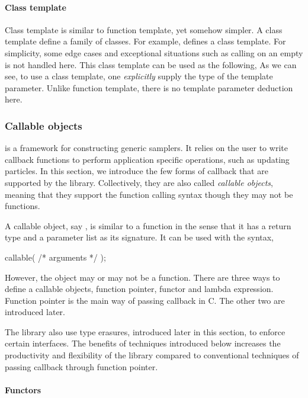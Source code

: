 \paragraph{Class template}

Class template is similar to function template, yet somehow simpler. A class
template define a family of classes. For example,
defines a  class template. For simplicity, some edge cases
and exceptional situations such as calling  on an empty
 is not handled here. This class template can be used as the
following,
As we can see, to use a class template, one \emph{explicitly} supply the type
of the template parameter. Unlike function template, there is no template
parameter deduction here.

\subsubsection{Callable objects}
\label{ssub:Callable objects}

\vsmc is a framework for constructing generic \smc samplers. It relies on the
user to write callback functions to perform application specific operations,
such as updating particles. In this section, we introduce the few forms of
callback that are supported by the library. Collectively, they are also called
\emph{callable objects}, meaning that they support the function calling syntax
though they may not be functions.

A callable object, say , is similar to a function in the
sense that it has a return type and a parameter list as its signature. It can
be used with the syntax,
\begin{cppcode}
callable( /* arguments */ );
\end{cppcode}
However, the object may or may not be a function. There are three ways to
define a callable objects, function pointer, functor and \cppoo lambda
expression. Function pointer is the main way of passing callback in C. The
other two are introduced later.

The library also use type erasures, introduced later in this section, to
enforce certain interfaces. The benefits of techniques introduced below
increases the productivity and flexibility of the library compared to
conventional techniques of passing callback through function pointer.

\paragraph{Functors}

